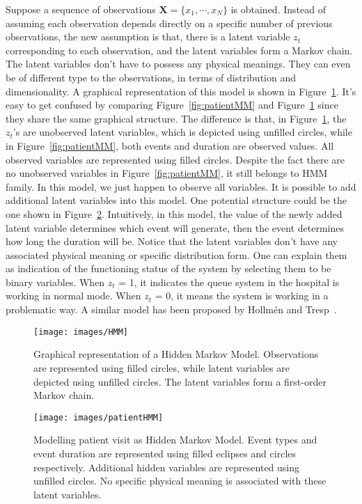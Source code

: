 Suppose a sequence of observations \(\mathbf{X} = \{x_1, \cdots, x_N\}\) is obtained. Instead of assuming each observation depends directly on a specific number of previous observations, the new assumption is that, there is a latent variable \(z_t\) corresponding to each observation, and the latent variables form a Markov chain. The latent variables don't have to possess any physical meanings. They can even be of different type to the observations, in terms of distribution and dimensionality. A graphical representation of this model is shown in Figure~\ref{fig:HMM}. It's easy to get confused by comparing Figure~\ref{fig:patientMM} and Figure~\ref{fig:HMM} since they share the same graphical structure. The difference is that, in Figure~\ref{fig:HMM}, the \(z_t\)'s are unobserved latent variables, which is depicted using unfilled circles, while in Figure~\ref{fig:patientMM}, both events and duration are observed values. All observed variables are represented using filled circles. Despite the fact there are no unobserved variables in Figure~\ref{fig:patientMM}, it still belongs to HMM family. In this model, we just happen to observe all variables. It is possible to add additional latent variables into this model. One potential structure could be the one shown in Figure~\ref{fig:patientHMM}. Intuitively, in this model, the value of the newly added latent variable determines which event will generate, then the event determines how long the duration will be. Notice that the latent variables don't have any associated physical meaning or specific distribution form. One can explain them as indication of the functioning status of the system by selecting them to be binary variables. When \(z_t\) = 1, it indicates the queue system in the hospital is working in normal mode. When \(z_t\) = 0, it means the system is working in a problematic way. A similar model has been proposed by Hollm\'en and Tresp~\cite{hollmen2000hidden}.

\begin{figure}[!ht]
	\begin{center}
		\texttt{[image: images/HMM]}
		\caption{Graphical representation of a Hidden Markov Model. Observations are represented using filled circles, while latent variables are depicted using unfilled circles. The latent variables form a first-order Markov chain.}
		\label{fig:HMM}
	\end{center}
\end{figure}

\begin{figure}[!ht]
	\begin{center}
		\texttt{[image: images/patientHMM]}
		\caption{Modelling patient visit as Hidden Markov Model. Event types and event duration are represented using filled eclipses and circles respectively. Additional hidden variables are represented using unfilled circles. No specific physical meaning is associated with these latent variables.}
		\label{fig:patientHMM}
	\end{center}
\end{figure}

